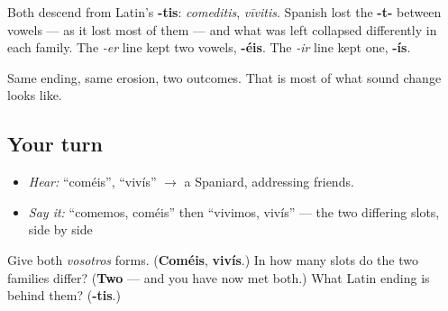 \begin{cousinweb}
Both descend from Latin's \textbf{-tis}: \emph{comeditis}, \emph{vīvitis}. Spanish lost the \textbf{-t-} between vowels — as it lost most of them — and what was left collapsed differently in each family. The \emph{-er} line kept two vowels, \textbf{-éis}. The \emph{-ir} line kept one, \textbf{-ís}.

Same ending, same erosion, two outcomes. That is most of what sound change looks like.
\end{cousinweb}

\subsection*{Your turn}
\begin{itemize}
\raggedright
  \item \emph{Hear:} \textquotedblleft{}coméis\textquotedblright{}, \textquotedblleft{}vivís\textquotedblright{} $\to$ a Spaniard, addressing friends.
  \item \emph{Say it:} \textquotedblleft{}comemos, coméis\textquotedblright{} then \textquotedblleft{}vivimos, vivís\textquotedblright{} — the two differing slots, side by side
\end{itemize}

\begin{tcolorbox}[breakable,colback=teal!4,colframe=teal!35!black,title={Before you move on}]
Give both \emph{vosotros} forms. (\textbf{Coméis}, \textbf{vivís}.) In how many slots do the two families differ? (\textbf{Two} — and you have now met both.) What Latin ending is behind them? (\textbf{-tis}.)
\end{tcolorbox}
